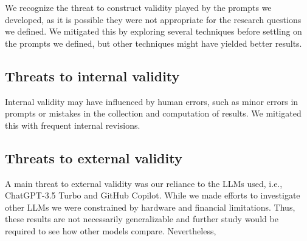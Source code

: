 We recognize the threat to construct validity played by the prompts we developed, as it is possible they were not appropriate for the research questions
we defined. We mitigated this by exploring several techniques  before settling on the prompts we defined, but other techniques might have yielded better
results.

\subsection{Threats to internal validity}

Internal validity may have influenced by human errors, such as minor errors in prompts or mistakes in the collection and computation of results.
We mitigated this with frequent internal revisions. %

\subsection{Threats to external validity}

A main threat to external validity was our reliance to the LLMs used, i.e., ChatGPT-3.5 Turbo and GitHub Copilot. While we made efforts to investigate other LLMs
we were constrained by hardware and financial limitations. Thus, these results are not necessarily generalizable and further study would be required to see how other models compare.  Nevertheless, 
